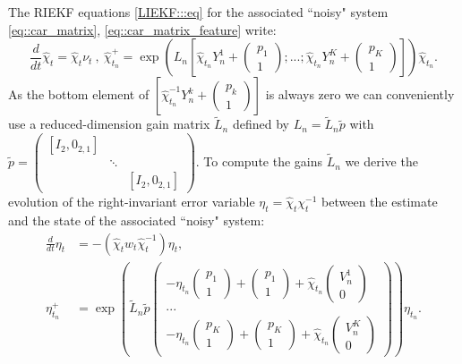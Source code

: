 \documentclass[a4paper,12pt,onecolumn]{article}
\begin{document}
The RIEKF equations \eqref{LIEKF:::eq} for the associated ``noisy" system \eqref{eq::car_matrix}, \eqref{eq::car_matrix_feature} write:
\begin{equation*}
\frac{d}{dt} \hat{\chi}_t  = \hat{\chi}_t \nu_t
~,~ 
\hat{\chi}_{t_n}^+  = \exp \left( L_n \left[ \hat{\chi}_{t_n} Y_n^1 +
\begin{pmatrix}
p_1 \\
1
\end{pmatrix}
; ... ; \hat{\chi}_{t_n} Y_n^K +
\begin{pmatrix}
p_K \\
1
\end{pmatrix}
\right] \right) \hat{\chi}_{t_n}.
\end{equation*}
As the bottom element of $ \left[ \hat{\chi}_{t_n}^{-1} Y_n^k +
\begin{pmatrix}
p_k \\ 1
\end{pmatrix} \right]$ is always zero we can conveniently use a reduced-dimension gain matrix $\tilde{L}_n$ defined by $L_n = \tilde{L}_n \tilde{p}$ with $\tilde{p}= \begin{pmatrix}[I_2, 0_{2,1}]  & & \\ & \ddots & \\ & & [I_2, 0_{2,1}] \end{pmatrix}$. To compute the gains $\tilde{L}_n$ we derive the evolution of the right-invariant error variable 
$
\eta_t = \hat{\chi}_t \chi_t^{-1}
$ between the estimate and the state of the associated ``noisy" system:
\begin{equation}
\label{eq::erro_car_feature}
\begin{aligned}
\frac{d}{dt} \eta_t  & = - (\hat{\chi}_t w_t \hat{\chi}_t^{-1}) \eta_t, \\
\eta_{t_n}^+ & = \exp \left( \tilde{L}_n \tilde{p} \begin{pmatrix} -\eta_{t_n} \begin{pmatrix} p_1 \\ 1 \end{pmatrix} + \begin{pmatrix} p_1 \\ 1 \end{pmatrix} + \hat{\chi}_{t_n} \begin{pmatrix} V_n^1 \\ 0 \end{pmatrix} \\ ... \\  -\eta_{t_n} \begin{pmatrix} p_K \\ 1 \end{pmatrix}+ \begin{pmatrix} p_K \\ 1 \end{pmatrix} +   \hat{\chi}_{t_n} \begin{pmatrix}  V_n^K\\ 0 \end{pmatrix} \end{pmatrix} \right) \eta_{t_n} .
\end{aligned}
\end{equation}
\end{document}

